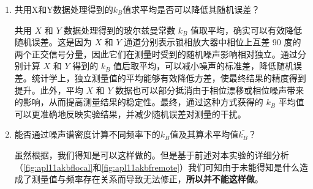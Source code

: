 \begin{enumerate}
\begin{itemize}
		\item \textbf{Spearman Correlation Coefficient:}
		\begin{itemize}
			\item Coefficient: 0.7904, p-value: 0.0195
			\item 结论：在显著性水平 0.05 下，两列数据存在显著的非参数相关性 (\( p \leq 0.05 \))
		\end{itemize}
	\end{itemize}
	
	对数据“本地测量所得各玻尔兹曼常数测量值”进行相关性分析，结果如下所示：
	\begin{itemize}
		\item \textbf{Pearson Correlation Coefficient:}
		\begin{itemize}
			\item Coefficient: 0.8656, p-value: 0.0055
			\item 结论：在显著性水平 0.05 下，两列数据存在显著的线性相关性 (\( p \leq 0.05 \))
		\end{itemize}
		
		\item \textbf{Spearman Correlation Coefficient:}
		\begin{itemize}
			\item Coefficient: 0.2381, p-value: 0.5702
			\item 结论：在显著性水平 0.05 下，两列数据不存在显著的非参数相关性 (\( p > 0.05 \))
		\end{itemize}
	\end{itemize}
	
	\item 共用X和Y数据处理得到的$k_B$值求平均是否可以降低其随机误差？
	
	共用 \( X \) 和 \( Y \) 数据处理得到的玻尔兹曼常数 \( k_B \) 值取平均，确实可以有效降低随机误差。这是因为 \( X \) 和 \( Y \) 通道分别表示锁相放大器中相位上互差 90 度的两个正交信号分量，因此它们在测量时受到的随机噪声影响相对独立。通过分别计算 \( X \) 和 \( Y \) 得到的 \( k_B \) 值后取平均，可以减小噪声的标准差，降低随机误差。统计学上，独立测量值的平均能够有效降低方差，使最终结果的精度得到提升。此外，平均 \( X \) 和 \( Y \) 数据也可以部分抵消由于相位漂移或相位噪声带来的影响，从而提高测量结果的稳定性。最终，通过这种方式获得的 \( k_B \) 平均值可以更准确地反映实验结果，并减少随机误差对测量的干扰。
	
	\item 能否通过噪声谱密度计算不同频率下的$k_B$值及其算术平均值$\bar{k_B}$？
	
	虽然根据\cite{c}，我们得知是可以这样做的。但是基于前述对本实验的详细分析（\cref{fig:apl11akbflocal}和\cref{fig:apl11akbfremote}）我们可知由于未能得知是什么造成了测量值与频率存在关系而导致无法修正，\textbf{所以并不能这样做}。
	

\end{enumerate}
